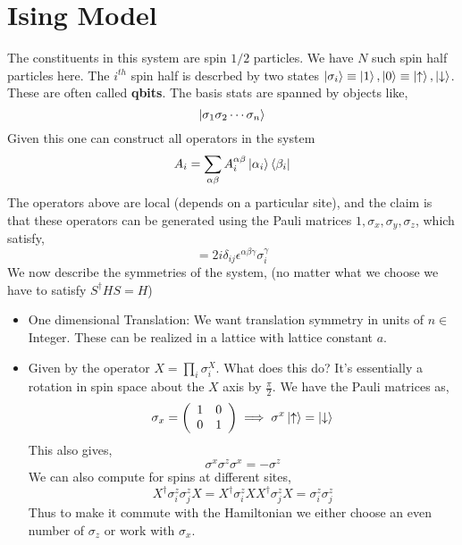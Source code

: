 \documentclass[a4paper,11pt]{article}
\newcommand{\be}{\begin{equation}}
\newcommand{\ee}{\end{equation}}
\def\s{\sigma}
\begin{document}
\section{Ising Model}
The constituents in this system are spin $1/2$ particles. We have $N$ such spin half particles here. The $ i^{th} $ spin half is descrbed by two states $\ket{\sigma_i} \equiv \ket{1}, \ket{0} \equiv \ket{\uparrow}, \ket{ \downarrow } $. These are often called {\bf qbits}. The basis stats are spanned by objects like, 
\begin{equation*}
\ket{\sigma_1 \sigma_2 \cdots \sigma_n}
\end{equation*}
Given this one can construct all operators in the system
\begin{equation*}
A_i = \sum_{\alpha \beta} A^{\alpha \beta}_i \ket{\alpha_i} \bra{\beta_i}
\end{equation*}
The operators above are local (depends on a particular site), and the claim is that these operators can be generated using the Pauli matrices $1, \sigma_x, \sigma_y, \sigma_z$, which satisfy,
\be
[\sigma_i^{\alpha}, \sigma_j^{\beta}] = 2 i \delta_{ij} \epsilon^{\alpha \beta \gamma}\sigma_i^{\gamma} 
\ee
We now describe the symmetries of the system, (no matter what we choose we have to satisfy $S^{\dagger} H S = H$)
\begin{itemize}
	\item One dimensional Translation: We want translation symmetry in units of $n \in$ Integer. 	These can be realized in a lattice with lattice constant $a$. 
	
	\item Given by the operator $X = \prod_i \s_i^X$. What does this do? It's essentially a rotation in spin space about the $X$ axis by $\frac{\pi}{2}$. We have the Pauli matrices as, 
	\begin{equation*}
	\s_x = \left( \begin{array}{cc}
	1 & 0 \\
	0 & 1
	\end{array}
	 \right) \implies \s^x \ket{\uparrow} = \ket{\downarrow}
	\end{equation*}
	This also gives, 
	\begin{equation*}
	\s^x \s^z \s^x = - \s^z
	\end{equation*}
	We can also compute for spins at different sites, 
	\begin{equation*}
	X^{\dagger} \s_i^z \s_j^z X = 
		X^{\dagger} \s_i^z X X^{\dagger} \s_j^z X  = \s_i^z \s_j^z
	\end{equation*}
	Thus to make it commute with the Hamiltonian we either choose an even number of $\s_z$ or work with $\s_x$. 
\end{itemize}
\end{document}
